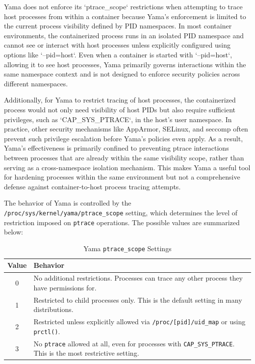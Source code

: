 \documentclass[12pt]{report}
\begin{document}
\begin{doublespace}
Yama does not enforce its `ptrace\_scope` restrictions when attempting to trace host processes from within a container because Yama’s enforcement is limited to the current process visibility defined by PID namespaces. In most container environments, the containerized process runs in an isolated PID namespace and cannot see or interact with host processes unless explicitly configured using options like `--pid=host`. Even when a container is started with `--pid=host`, allowing it to see host processes, Yama primarily governs interactions within the same namespace context and is not designed to enforce security policies across different namespaces.

Additionally, for Yama to restrict tracing of host processes, the containerized process would not only need visibility of host PIDs but also require sufficient privileges, such as `CAP\_SYS\_PTRACE`, in the host’s user namespace. In practice, other security mechanisms like AppArmor, SELinux, and seccomp often prevent such privilege escalation before Yama’s policies even apply. As a result, Yama’s effectiveness is primarily confined to preventing ptrace interactions between processes that are already within the same visibility scope, rather than serving as a cross-namespace isolation mechanism. This makes Yama a useful tool for hardening processes within the same environment but not a comprehensive defense against container-to-host process tracing attempts.


The behavior of Yama is controlled by the \texttt{/proc/sys/kernel/yama/ptrace\_scope} setting, which determines the level of restriction imposed on \texttt{ptrace} operations. The possible values are summarized below:

\begin{table}[h]
    \centering
    \caption{Yama \texttt{ptrace\_scope} Settings}
    \label{tab:yama-settings}
    \begin{tabular}{|c|p{10cm}|}
        \hline
        \textbf{Value} & \textbf{Behavior} \\
        \hline
        0 & No additional restrictions. Processes can trace any other process they have permissions for. \\
        \hline
        1 & Restricted to child processes only. This is the default setting in many distributions. \\
        \hline
        2 & Restricted unless explicitly allowed via \texttt{/proc/[pid]/uid\_map} or using \texttt{prctl()}. \\
        \hline
        3 & No \texttt{ptrace} allowed at all, even for processes with \texttt{CAP\_SYS\_PTRACE}. This is the most restrictive setting. \\
        \hline
    \end{tabular}
\end{table}


\end{doublespace}
\end{document}
